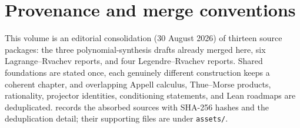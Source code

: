 \documentclass[11pt,oneside]{article}
\numberwithin{equation}{section}
\theoremstyle{definition}
\theoremstyle{remark}
\begin{document}
\clearpage
\tableofcontents
\clearpage

\section*{Provenance and merge conventions}

This volume is an editorial consolidation (30 August 2026) of thirteen
source packages: the three polynomial-synthesis drafts already merged here,
six Lagrange--Rvachev reports, and four Legendre--Rvachev reports.  Shared
foundations are stated once, each genuinely different construction keeps a
coherent chapter, and overlapping Appell calculus, Thue--Morse products,
rationality, projector identities, conditioning statements, and Lean
roadmaps are deduplicated.
 records the absorbed sources with SHA-256
hashes and the deduplication detail; their supporting files are under
\nolinkurl{assets/}.
\end{document}
